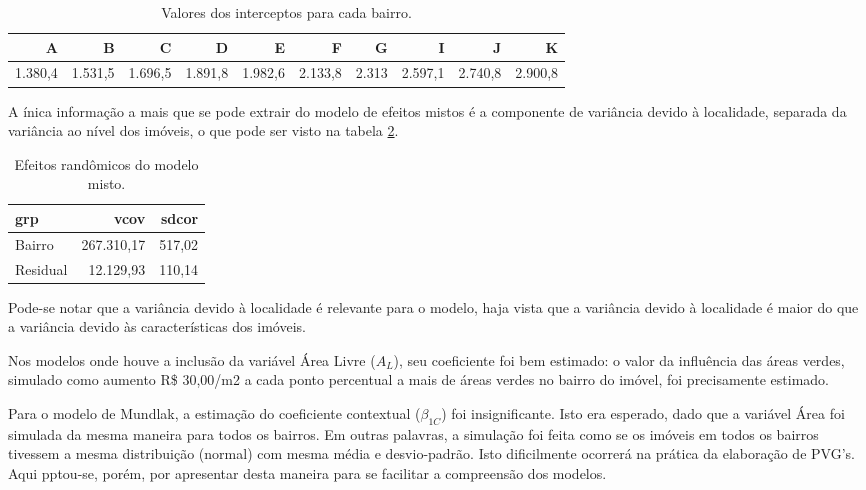\documentclass[
  a4paper, 11pt]{article}
\begin{document}
\begin{table}

\caption{\label{tab:somaitcpt}Valores dos interceptos para cada bairro.}
\centering
\fontsize{10}{12}\selectfont
\begin{tabular}[t]{rrrrrrrrrr}
\toprule
A & B & C & D & E & F & G & I & J & K\\
\midrule
1.380,4 & 1.531,5 & 1.696,5 & 1.891,8 & 1.982,6 & 2.133,8 & 2.313 & 2.597,1 & 2.740,8 & 2.900,8\\
\bottomrule
\end{tabular}
\end{table}

A ínica informação a mais que se pode extrair do modelo de efeitos
mistos é a componente de variância devido à localidade, separada da
variância ao nível dos imóveis, o que pode ser visto na tabela
\ref{tab:variancias}.

\begin{table}

\caption{\label{tab:variancias}Efeitos randômicos do modelo misto.}
\centering
\begin{tabular}[t]{lrr}
\toprule
grp & vcov & sdcor\\
\midrule
\rowcolor{gray!6}  Bairro & 267.310,17 & 517,02\\
Residual & 12.129,93 & 110,14\\
\bottomrule
\end{tabular}
\end{table}

Pode-se notar que a variância devido à localidade é relevante para o
modelo, haja vista que a variância devido à localidade é maior do que a
variância devido às características dos imóveis.

Nos modelos onde houve a inclusão da variável Área Livre (\(A_L\)), seu
coeficiente foi bem estimado: o valor da influência das áreas verdes,
simulado como aumento R\$ 30,00/m2 a cada ponto percentual a mais de
áreas verdes no bairro do imóvel, foi precisamente estimado.

Para o modelo de Mundlak, a estimação do coeficiente contextual
(\(\beta_{1C}\)) foi insignificante. Isto era esperado, dado que a
variável Área foi simulada da mesma maneira para todos os bairros. Em
outras palavras, a simulação foi feita como se os imóveis em todos os
bairros tivessem a mesma distribuição (normal) com mesma média e
desvio-padrão. Isto dificilmente ocorrerá na prática da elaboração de
PVG's. Aqui pptou-se, porém, por apresentar desta maneira para se
facilitar a compreensão dos modelos.
\end{document}
